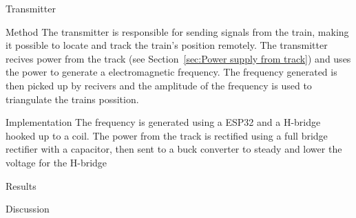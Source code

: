 \newpage
\begin{section}{Transmitter}

    \begin{subsection}{Method}
    The transmitter is responsible for sending signals from the train, making it possible to locate and track the train's position remotely.
    The transmitter recives power from the track (see Section~\ref{sec:Power supply from track}) and uses the power to generate a electromagnetic frequency.
    The frequency generated is then picked up by recivers and the amplitude of the frequency is used to triangulate the trains possition.

    \end{subsection}
    \begin{subsection}{Implementation}
        The frequency is generated using a ESP32 and a H-bridge hooked up to a coil. 
        The power from the track is rectified using a full bridge rectifier with a capacitor, 
        then sent to a buck converter to steady and lower the voltage for the H-bridge

    \end{subsection}
    \begin{subsection}{Results}

    \end{subsection}
    \begin{subsection}{Discussion}

    \end{subsection}

\end{section}
